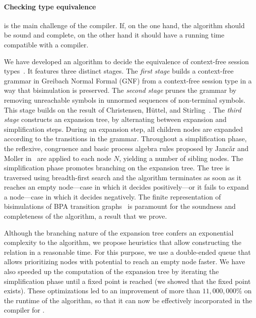 
\paragraph{Checking type equivalence}

is the main challenge of the compiler. If, on the one hand, the
algorithm should be sound and complete, on the other hand it should
have a running time compatible with a compiler.  %

We have developed an algorithm to decide the equivalence of
context-free session types~\cite{typeEquivalence}.  It features three
distinct stages.
%
The \emph{first stage} builds a context-free grammar in Greibach
Normal Formal (GNF) %
from a context-free session type in a way that bisimulation is
preserved.
%
The \emph{second stage} prunes the grammar by removing unreachable
symbols in unnormed sequences of non-terminal symbols. This stage
builds on the result of Christensen, H\"uttel, and 
Stirling~\cite{DBLP:journals/iandc/ChristensenHS95}.
%
The \emph{third stage} constructs an expansion tree, by alternating
between expansion and simplification steps. During an expansion step, 
all children nodes are expanded according to the transitions in the 
grammar. %
Throughout a simplification phase, the reflexive, congruence and basic
process algebra rules proposed by Janc\v ar and Moller
in~\cite{janvcar1999techniques} are applied to each node $N$, yielding
a number of sibling nodes.  The simplification phase promotes
branching on the expansion tree.  The tree is traversed using
breadth-first search and the algorithm terminates as soon as it
reaches an empty node---case in which it decides positively---or it
fails to expand a node---case in which it decides negatively.  The
finite representation of bisimulations of BPA transition
graphs~\cite{caucal1986decidabilite,
  DBLP:journals/iandc/ChristensenHS95} is paramount for the soundness
and completeness of the algorithm, a result that we prove.

Although the branching nature of the expansion tree confers an
exponential complexity to the algorithm, we propose heuristics that
allow constructing the relation in a reasonable time. For this
purpose, we use a double-ended queue that allows prioritizing nodes
with potential to reach an empty node faster.  We have also speeded up
the computation of the expansion tree by iterating the simplification
phase until a fixed point is reached (we showed that the fixed point
exists).  These optimizations led to an improvement of more than
$11,000,000\%$ on the runtime of the algorithm, so that it can now be
effectively incorporated in the compiler for \freest.

